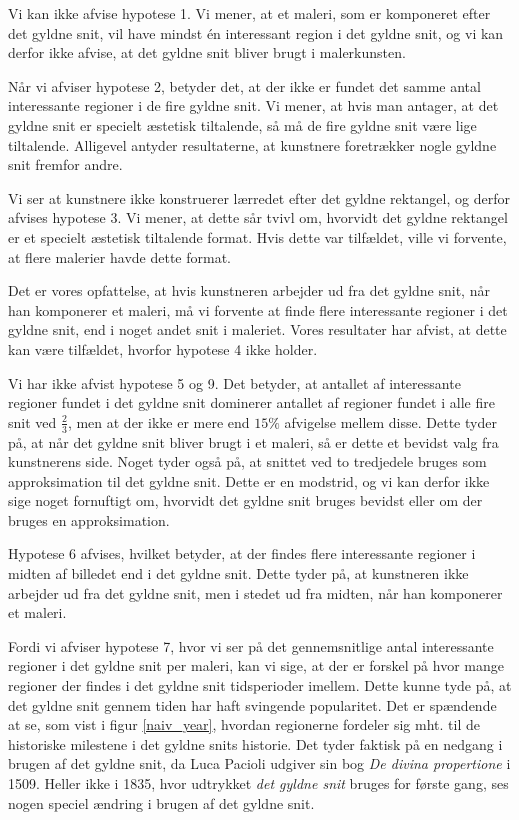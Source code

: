{Vi kan ikke afvise hypotese 1. Vi mener, at et maleri, som er komponeret
efter det gyldne snit, vil have mindst én interessant region i det
gyldne snit, og vi kan derfor ikke afvise, at det gyldne snit bliver
brugt i malerkunsten.

Når vi afviser hypotese 2, betyder det, at der ikke er fundet det samme
antal interessante regioner i de fire gyldne snit. Vi mener, at hvis man
antager, at det gyldne snit er specielt æstetisk tiltalende, så må de
fire gyldne snit være lige tiltalende. Alligevel antyder resultaterne,
at kunstnere foretrækker nogle gyldne snit fremfor andre.

Vi ser at kunstnere ikke konstruerer lærredet efter det gyldne
rektangel, og derfor afvises hypotese 3. Vi mener, at dette sår tvivl om,
hvorvidt det gyldne rektangel er et specielt æstetisk tiltalende format.
Hvis dette var tilfældet, ville vi forvente, at flere malerier havde
dette format.

Det er vores opfattelse, at hvis kunstneren arbejder ud fra det gyldne
snit, når han komponerer et maleri, må vi forvente at finde flere
interessante regioner i det gyldne snit, end i noget andet snit i
maleriet. Vores resultater har afvist, at dette kan være tilfældet,
hvorfor hypotese 4 ikke holder.

Vi har ikke afvist hypotese 5 og 9. Det betyder, at antallet af
interessante regioner fundet i det gyldne snit dominerer antallet af
regioner fundet i alle fire snit ved $\frac{2}{3}$, men at der ikke er
mere end $15 \%$ afvigelse mellem disse. Dette tyder på, at når det
gyldne snit bliver brugt i et maleri, så er dette et bevidst valg fra
kunstnerens side. Noget tyder også på, at snittet ved to tredjedele
bruges som approksimation til det gyldne snit. Dette er en modstrid, og
vi kan derfor ikke sige noget fornuftigt om, hvorvidt det gyldne snit
bruges bevidst eller om der bruges en approksimation.

Hypotese 6 afvises, hvilket betyder, at der findes flere interessante
regioner i midten af billedet end i det gyldne snit. Dette tyder på, at
kunstneren ikke arbejder ud fra det gyldne snit, men i stedet ud fra
midten, når han komponerer et maleri.

Fordi vi afviser hypotese 7, hvor vi ser på det gennemsnitlige antal
interessante regioner i det gyldne snit per maleri, kan vi sige, at der
er forskel på hvor mange regioner der findes i det gyldne snit
tidsperioder imellem.  Dette kunne tyde på, at det gyldne snit gennem
tiden har haft svingende popularitet. Det er spændende at se, som vist i
figur \ref{naiv_year}, hvordan regionerne fordeler sig mht. til
de historiske milestene i det gyldne snits historie. Det tyder faktisk
på en nedgang i brugen af det gyldne snit, da Luca Pacioli udgiver sin
bog \emph{De divina propertione} i 1509\cite{Markowsky1992}. Heller ikke
i 1835, hvor udtrykket \emph{det gyldne snit} bruges for første
gang\cite{Markowsky1992}, ses nogen speciel ændring i brugen af det
gyldne snit.

}
